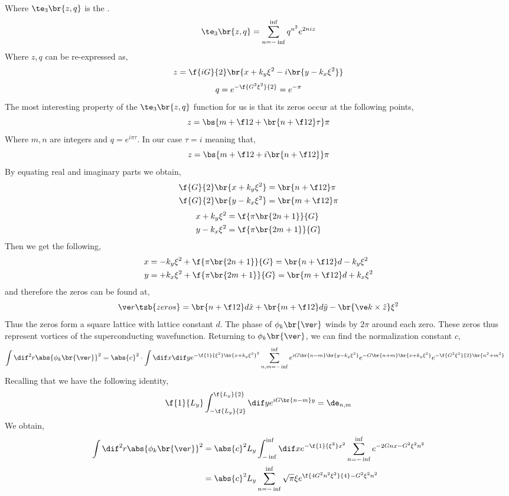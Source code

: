 \documentclass{article}
\begin{document}
Where $\te_3\br{z, q}$ is the .
\[ \te_{3}\br{z,q} = \sum_{n=-\inf}^{\inf} q^{n^2} e^{2niz} \]
Where $z,q$ can be re-expressed as,
\[ z = \f{iG}{2}\br{x+k_y \xi^2 - i \br{y - k_x\xi^2}} \]
\[ q = e^{-\f{G^2\xi^2}{2}} = e^{-\pi} \]
The most interesting property of the $\te_3\br{z,q}$ function for us is that its zeros occur at the following points,
\[ z = \bs{m + \f12 + \br{n + \f12}\tau}\pi \]
Where $m,n$ are integers and $q = e^{i\pi \tau}$. In our case $\tau = i$ meaning that,
\[ z = \bs{m + \f12 + i\br{n + \f12}}\pi \]
By equating real and imaginary parts we obtain,
\begin{align*}
\f{G}{2}\br{x + k_y \xi^2} &= \br{n + \f12}\pi \\
\f{G}{2}\br{y - k_x \xi^2} &= \br{m + \f12}\pi
\end{align*}
\begin{align*}
x + k_y \xi^2 &= \f{\pi\br{2n + 1}}{G} \\
y - k_x \xi^2 &= \f{\pi\br{2m + 1}}{G}
\end{align*}
Then we get the following,
\begin{align*}
x &=  - k_y \xi^2 + \f{\pi\br{2n + 1}}{G} = \br{n+\f12}d - k_y \xi^2\\
y &=  + k_x \xi^2 + \f{\pi\br{2m + 1}}{G} = \br{m+\f12}d + k_x \xi^2
\end{align*}
and therefore the zeros can be found at,
\[ \ve r\tsb{zeros} = \br{n+\f12}d \hat x + \br{m+ \f12}d \hat y - \br{\ve k \times \hat z}\xi^2 \]
Thus the zeros form a square lattice with lattice constant $d$. The phase of $\phi_k\br{\ve r}$ winds by $2\pi$ around each zero. These zeros thus represent vortices of the superconducting wavefunction. Returning to $\phi_k\br{\ve r}$, we can find the normalization constant $c$,
\begin{align*}
    \int \dif^2 r \abs{\phi_k \br{\ve r}}^2
    &= \abs{c}^2 \cdot \int\dif x \dif y e^{-\f{1}{\xi^2}\br{x + k_y \xi^2}^2} \sum_{n,m = -\inf}^{\inf} e^{i G\br{n-m}\br{y - k_y \xi^2}}e^{-G\br{n+m}\br{x+ k_y \xi^2}}e^{-\f{G^2\xi^2}{2}\br{n^2+m^2}}
\end{align*}
Recalling that we have the following identity,
\[ \f{1}{L_y} \int_{- \f{L_y}{2}}^{\f{L_y}{2}} \dif y e^{i G \br{n - m} y} = \de_{n,m} \]
We obtain,
\begin{align*}
    \int \dif^2 r \abs{\phi_k \br{\ve r}}^2
    &= \abs{c}^2 L_y \int_{-\inf}^{\inf}\dif x e^{-\f{1}{\xi^2}x^2} \sum_{n = -\inf}^{\inf} e^{-2 G nx - G^2 \xi^2 n^2} \\
    &= \abs{c}^2 L_y \sum_{n = -\inf}^{\inf} \sqrt{\pi}\xi e^{\f{4G^2n^2\xi^2}{4} - G^2\xi^2n^2}
\end{align*}
\end{document}
